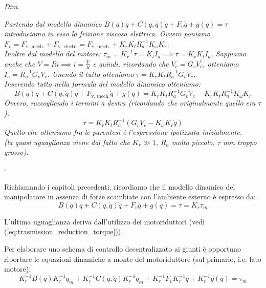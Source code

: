 \begin{mdframed}[leftmargin=15pt, rightmargin=15pt, leftline=false, rightline=false]
\textit{Dim.}

\textit{
Partendo dal modello dinamico {\boldmath$B(q)\ddot{q} + C(q, \dot{q})\dot{q} + F_v\dot{q} + g(q) = \tau$} introduciamo in esso la frizione viscosa elettrica. Ovvero poniamo {\boldmath$F_v = F_\text{v. mech.} + F_\text{v. electr.} = F_\text{v. mech.} + K_rK_tR_a^{-1}K_\omega K_r$}. \\
Inoltre dal modello del motore: 
{\boldmath$\tau_m = K_r^{-1} \tau = K_t I_a \implies \tau = K_r K_t I_a$}. Sappiamo anche che $V = Ri \implies i = \frac{V}{R}$ e quindi, ricordando che {\boldmath$V_c = G_v V_c^{'}$}, otteniamo {\boldmath $I_a = R_a^{-1}G_v V_c$}. Unendo il tutto otteniamo {\boldmath $\tau = K_r K_t R_a^{-1}G_v V_c$}.\\
Inserendo tutto nella formula del modello dinamico otteniamo:
\boldmath
$$
B(q)\ddot{q} + C(q, \dot{q})\dot{q} + F_{\text{v. mech.}}\dot{q} + g(q) = K_r K_t R_a^{-1}G_v V_c - K_rK_tR_a^{-1}K_\omega K_r
$$
Ovvero, raccogliendo i termini a destra (ricordando che originalmente quello era $\tau$):
\begin{equation}\label{eq:torque_command}
\tau =  K_r K_t R_a^{-1}(G_v V_c - K_\omega K_r \dot{q})
\end{equation}
Quello che otteniamo fra le parentesi è l'espressione ipotizzata inizialmente.\\
(la quasi uguaglianza viene dal fatto che $K_r \gg 1$, $R_a$ molto piccolo, $\tau$ non troppo grosso).
}

\raggedleft $\square$
\end{mdframed}


\vspace*{25pt}



Richiamando i capitoli precedenti, ricordiamo che il modello dinamico del manipolatore in assenza di forze scambiate con l’ambiente esterno è espresso da:
\boldmath
\begin{equation}\label{eq:dynamic_no_ext_forces}
B(q)\ddot{q} + C(q, \dot{q})\dot{q} + F_v\dot{q} + g(q) = \tau = K_r \tau_m
\end{equation}
\unboldmath

L'ultima uguaglianza deriva dall'utilizzo dei motoriduttori (vedi (\ref{eq:trasmission_reduction_torque})).

Per elaborare uno schema di controllo decentralizzato ai giunti è opportuno riportare le equazioni dinamiche a monte del motoriduttore (sul primario, i.e. lato motore):
\boldmath
$$
K_r^{-1}B(q)K_r^{-1}\ddot{q}_m + K_r^{-1}C(q, \dot{q})K_r^{-1}\dot{q}_m + K_r^{-1}F_vK_r^{-1}\dot{q} + K_r^{-1}g(q) = \tau_m
$$
\unboldmath

